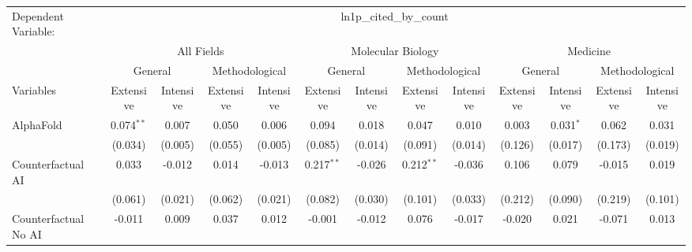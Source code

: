 \begingroup
\centering
\begin{tabular}{lcccccccccccc}
   \tabularnewline \midrule \midrule
   Dependent Variable: & \multicolumn{12}{c}{ln1p\_cited\_by\_count}\\
 & \multicolumn{4}{c}{All Fields} & \multicolumn{4}{c}{Molecular Biology} & \multicolumn{4}{c}{Medicine} \\
\cmidrule(lr){2-5} \cmidrule(lr){6-9} \cmidrule(lr){10-13}
 & \multicolumn{2}{c}{General} & \multicolumn{2}{c}{Methodological} & \multicolumn{2}{c}{General} & \multicolumn{2}{c}{Methodological} & \multicolumn{2}{c}{General} & \multicolumn{2}{c}{Methodological} \\
\cmidrule(lr){2-3} \cmidrule(lr){4-5} \cmidrule(lr){6-7} \cmidrule(lr){8-9} \cmidrule(lr){10-11} \cmidrule(lr){12-13}
Variables & \multicolumn{1}{c}{Extensive} & \multicolumn{1}{c}{Intensive} & \multicolumn{1}{c}{Extensive} & \multicolumn{1}{c}{Intensive} & \multicolumn{1}{c}{Extensive} & \multicolumn{1}{c}{Intensive} & \multicolumn{1}{c}{Extensive} & \multicolumn{1}{c}{Intensive} & \multicolumn{1}{c}{Extensive} & \multicolumn{1}{c}{Intensive} & \multicolumn{1}{c}{Extensive} & \multicolumn{1}{c}{Intensive} \\
\cmidrule(lr){1-1}\cmidrule(lr){2-2} \cmidrule(lr){3-3} \cmidrule(lr){4-4} \cmidrule(lr){5-5} \cmidrule(lr){6-6} \cmidrule(lr){7-7} \cmidrule(lr){8-8} \cmidrule(lr){9-9} \cmidrule(lr){10-10} \cmidrule(lr){11-11} \cmidrule(lr){12-12} \cmidrule(lr){13-13}
   AlphaFold                                & 0.074$^{**}$ & 0.007    & 0.050   & 0.006       & 0.094        & 0.018    & 0.047        & 0.010    & 0.003   & 0.031$^{*}$ & 0.062   & 0.031\\   
                                            & (0.034)      & (0.005)  & (0.055) & (0.005)     & (0.085)      & (0.014)  & (0.091)      & (0.014)  & (0.126) & (0.017)     & (0.173) & (0.019)\\   
   Counterfactual AI                        & 0.033        & -0.012   & 0.014   & -0.013      & 0.217$^{**}$ & -0.026   & 0.212$^{**}$ & -0.036   & 0.106   & 0.079       & -0.015  & 0.019\\   
                                            & (0.061)      & (0.021)  & (0.062) & (0.021)     & (0.082)      & (0.030)  & (0.101)      & (0.033)  & (0.212) & (0.090)     & (0.219) & (0.101)\\   
   Counterfactual No AI                     & -0.011       & 0.009    & 0.037   & 0.012       & -0.001       & -0.012   & 0.076        & -0.017   & -0.020  & 0.021       & -0.071  & 0.013\\   

\end{tabular}
